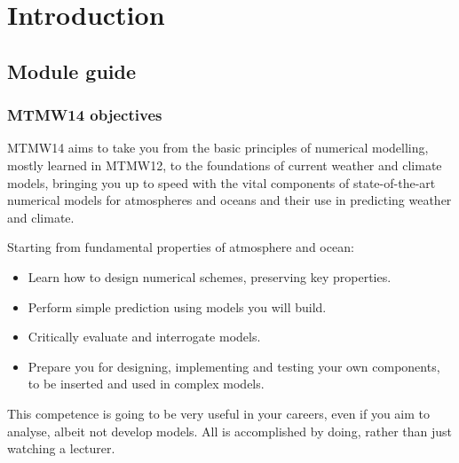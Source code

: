 \documentclass[11pt,fleqn]{book} %
\begin{document}
	\renewcommand\contentsname{Table of Contents}
	\renewcommand{\bibname}{Bibliography}
	\tableofcontents%
	
	
	\pagestyle{fancy} %
	
	
\chapter{Introduction}
	
	\section{Module guide}
	\subsection{MTMW14 objectives}
	MTMW14 aims to take you from the basic principles of numerical modelling, mostly learned in MTMW12, to the foundations of current weather and climate models, bringing you up to speed with the vital components of state-of-the-art numerical models for atmospheres and oceans and their use in predicting weather and climate.
	
	Starting from fundamental properties of atmosphere and ocean:
\begin{itemize}
\item	Learn how to design numerical schemes, preserving key properties.
\item	Perform simple prediction using models you will build.
\item	Critically evaluate and interrogate models.
\item	Prepare you for designing, implementing and testing your own components, to be inserted and used in complex models.
\end{itemize}
	
	This competence is going to be very useful in your careers, even if you aim to analyse, albeit not develop models. All is accomplished by doing, rather than just watching a lecturer.\\
	
\end{document}
